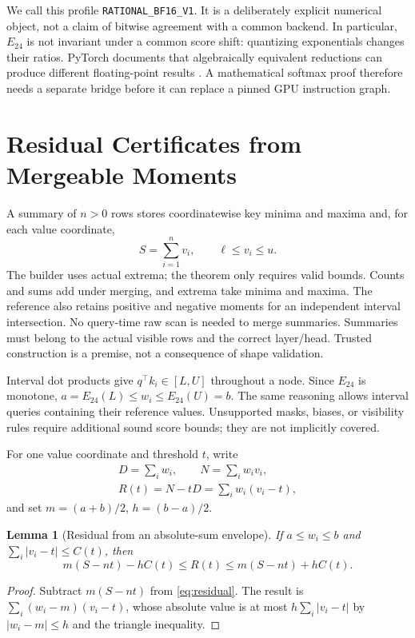 \documentclass{article}
\theoremstyle{plain}
\newtheorem{lemma}[theorem]{Lemma}
\theoremstyle{definition}
\theoremstyle{remark}
\newcommand{\E}{E_{24}}
\newcommand{\profile}{\texttt{RATIONAL\_BF16\_V1}}
\begin{document}
We call this profile \profile{}. It is a deliberately explicit numerical
object, not a claim of bitwise agreement with a common backend. In
particular, $\E$ is not invariant under a common score shift: quantizing
exponentials changes their ratios. PyTorch documents that algebraically
equivalent reductions can produce different floating-point results
\citep{pytorchaccuracy}. A mathematical softmax proof therefore needs a
separate bridge before it can replace a pinned GPU instruction graph.

\section{Residual Certificates from Mergeable Moments}
\label{sec:residual}

A summary of $n>0$ rows stores coordinatewise key minima and maxima and,
for each value coordinate,
\begin{equation}
 S=\sum_{i=1}^n v_i,\qquad \ell\le v_i\le u.
 \label{eq:summary}
\end{equation}
The builder uses actual extrema; the theorem only requires valid bounds.
Counts and sums add under merging, and extrema take minima and maxima.
The reference also retains positive and negative moments for an independent
interval intersection. No query-time raw scan is needed to merge summaries.
Summaries must belong to the actual visible rows and the correct layer/head.
Trusted construction is a premise, not a consequence of shape validation.

Interval dot products give $q^\top k_i\in[L,U]$ throughout a node. Since
$\E$ is monotone, $a=\E(L)\le w_i\le\E(U)=b$.
The same reasoning allows interval queries containing their reference
values. Unsupported masks, biases, or visibility rules require additional
sound score bounds; they are not implicitly covered.

For one value coordinate and threshold $t$, write
\begin{equation}
 \begin{gathered}
 D=\sum_iw_i,\qquad N=\sum_iw_iv_i,\\
 R(t)=N-tD=\sum_iw_i(v_i-t),
 \end{gathered}
 \label{eq:residual}
\end{equation}
and set $m=(a+b)/2$, $h=(b-a)/2$.

\begin{lemma}[Residual from an absolute-sum envelope]
\label{lem:generic}
If $a\le w_i\le b$ and $\sum_i|v_i-t|\le C(t)$, then
\begin{equation}
 m(S-nt)-hC(t)\le R(t)\le m(S-nt)+hC(t).
 \label{eq:bound}
\end{equation}
\end{lemma}
\begin{proof}
Subtract $m(S-nt)$ from \cref{eq:residual}. The result is
$\sum_i(w_i-m)(v_i-t)$, whose absolute value is at most
$h\sum_i|v_i-t|$ by $|w_i-m|\le h$ and the triangle inequality.
\end{proof}
\end{document}
